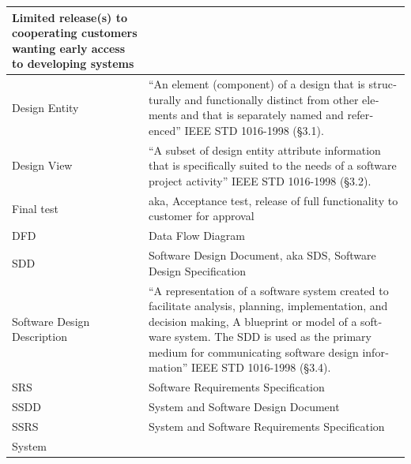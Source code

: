 \documentclass[twoside,letterpaper]{article}
\begin{document}
{\begin{flushleft}
\begin{supertabular}{|m{1.3587599in}|m{5.00806in}|}
\color{black} Limited release(s) to cooperating
customers wanting early access to developing systems\\\hline
{}\color{black} Design Entity &
\color{black}
\foreignlanguage{english}{{\textquotedblleft}}\foreignlanguage{english}{An
element (component) of a design that is structurally and functionally
distinct from other elements and that is separately named and
referenced{\textquotedblright} IEEE STD 1016-1998 (\S3.1).}\\\hline
{}\color{black} Design View &
\color{black}
\foreignlanguage{english}{{\textquotedblleft}}\foreignlanguage{english}{A
subset of design entity attribute information that is specifically
suited to the needs of a software project activity{\textquotedblright}
IEEE STD 1016-1998 (\S3.2).}\\\hline
{}\color{black} Final test &
\color{black} aka, Acceptance test, release of
full functionality to customer for approval\\\hline
{}\color{black} DFD &
\color{black} Data Flow Diagram\\\hline
{}\color{black} SDD &
\color{black} Software Design Document, aka SDS,
Software Design Specification\\\hline
{}\color{black} Software Design Description &
\color{black}
\foreignlanguage{english}{{\textquotedblleft}}\foreignlanguage{english}{A
representation of a software system created to facilitate analysis,
planning, implementation, and decision making, A blueprint or model of
a software system. The SDD is used as the primary medium for
communicating software }\foreignlanguage{english}{design
information{\textquotedblright} IEEE STD 1016-1998 (\S3.4).}\\\hline
{}\color{black} SRS &
\color{black} Software Requirements
Specification\\\hline
{}\color{black} SSDD &
\color{black} System and Software Design
Document\\\hline
{}\color{black} SSRS &
\color{black} System and Software Requirements
Specification\\\hline
{}\color{black} System &

\end{supertabular}
\end{flushleft}}
\end{document}
